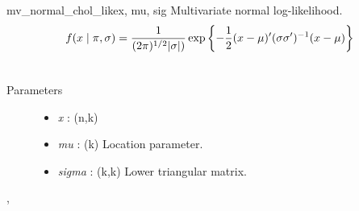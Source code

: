 \hypertarget{pymc.distributions.mv_normal_chol_like}{}\begin{funcdesc}{mv\_normal\_chol\_like}{x, mu, sig}
Multivariate normal log-likelihood.
\begin{gather}
\begin{split}f(x \mid \pi, \sigma) = \frac{1}{(2\pi)^{1/2}|\sigma|)} \exp\left\{ -\frac{1}{2} (x-\mu)^{\prime}(\sigma \sigma^{\prime})^{-1}(x-\mu) \right\}\end{split}\notag\\\begin{split}\end{split}\notag
\end{gather}\begin{description}
\item[Parameters] \leavevmode\begin{itemize}
\item {} 
\emph{x} : (n,k)

\item {} 
\emph{mu} : (k) Location parameter.

\item {} 
\emph{sigma} : (k,k) Lower triangular matrix.

\end{itemize}

\end{description}




\hyperlink{pymc.distributions.mv_normal_like}{}, \hyperlink{pymc.distributions.mv_normal_cov_like}{}


\end{funcdesc}

